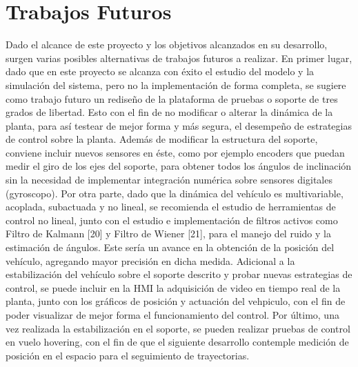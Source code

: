 \documentclass[\main/main.tex]{subfiles}
\begin{document}
\section{Trabajos Futuros}
Dado el alcance de este proyecto y los objetivos alcanzados en su desarrollo, surgen varias posibles alternativas de trabajos futuros a realizar.
\hfill \break
En primer lugar, dado que en este proyecto se alcanza con éxito el estudio del modelo y la simulación del sistema, pero no la implementación de forma completa, se sugiere como trabajo futuro un rediseño de la plataforma de pruebas o soporte de tres grados de libertad. Esto con el fin de no modificar o alterar la dinámica de la planta, para así testear de mejor forma y más segura, el desempeño de estrategias de control sobre la planta.
\hfill \break
Además de modificar la estructura del soporte, conviene incluir nuevos sensores en éste, como por ejemplo encoders que puedan medir el giro de los ejes del soporte, para obtener todos los ángulos de inclinación sin la necesidad de implementar integración numérica sobre sensores digitales (gyroscopo).
\hfill \break
Por otra parte, dado que la dinámica del vehículo es multivariable, acoplada, subactuada y no lineal, se recomienda el estudio de herramientas de control no lineal, junto con el estudio e implementación de filtros activos como Filtro de Kalmann [20] y Filtro de Wiener [21], para el manejo del ruido y la estimación de ángulos. Este sería un avance en la obtención de la posición del vehículo, agregando mayor precisión en dicha medida.
\hfill \break
Adicional a la estabilización del vehículo sobre el soporte descrito y probar nuevas estrategias de control, se puede incluir en la HMI la adquisición de video en tiempo real de la planta, junto con los gráficos de posición y actuación del vehpiculo, con el fin de poder visualizar de mejor forma el funcionamiento del control. 
\hfill \break
Por último, una vez realizada la estabilización en el soporte, se pueden realizar pruebas de control en vuelo hovering, con el fin de que el siguiente desarrollo contemple medición de posición en el espacio para el seguimiento de trayectorias.
\end{document}
